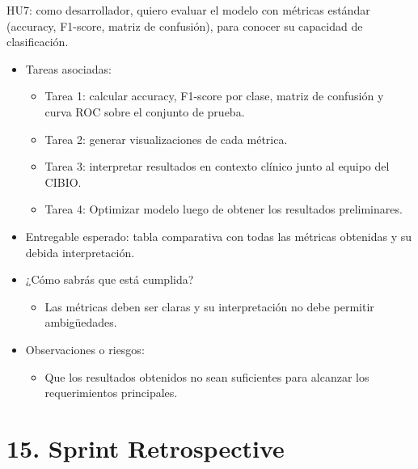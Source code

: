 \documentclass[
11pt, %
]{charter}
\begin{document}
HU7: como desarrollador, quiero evaluar el modelo con métricas estándar (accuracy, F1-score, matriz de confusión), para conocer su capacidad 
de clasificación.
\begin{itemize}
  \item Tareas asociadas:
    \begin{itemize}
      \item Tarea 1: calcular accuracy, F1-score por clase, matriz de confusión y curva ROC sobre el conjunto de prueba.
      \item Tarea 2: generar visualizaciones de cada métrica.
      \item Tarea 3: interpretar resultados en contexto clínico junto al equipo del CIBIO.
      \item Tarea 4: Optimizar modelo luego de obtener los resultados preliminares.
    \end{itemize}
  \item Entregable esperado: tabla comparativa con todas las métricas obtenidas y su debida interpretación.
  \item ¿Cómo sabrás que está cumplida?
    \begin{itemize}
      \item Las métricas deben ser claras y su interpretación no debe permitir ambigüedades. 
    \end{itemize}
  \item Observaciones o riesgos:
    \begin{itemize}
      \item Que los resultados obtenidos no sean suficientes para alcanzar los requerimientos principales.
    \end{itemize}
\end{itemize}

\newpage

\section{15. Sprint Retrospective}    
\label{sec:sprint_retro}
\end{document}
